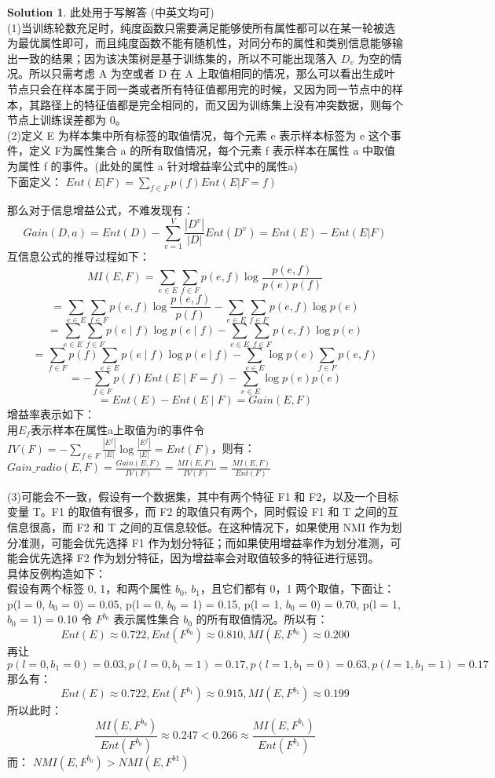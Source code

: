\documentclass[a4paper]{article}
\numberwithin{equation}{section}
\theoremstyle{definition}
\newtheorem*{solution}{Solution}
\begin{document}
\begin{solution}
	此处用于写解答 (中英文均可)\\
 (1)当训练轮数充足时，纯度函数只需要满足能够使所有属性都可以在某一轮被选为最优属性即可，而且纯度函数不能有随机性，对同分布的属性和类别信息能够输出一致的结果；因为该决策树是基于训练集的，所以不可能出现落入 $D_{v}$ 为空的情况。所以只需考虑 A 为空或者 D 在 A 上取值相同的情况，那么可以看出生成叶节点只会在样本属于同一类或者所有特征值都用完的时候，又因为同一节点中的样本，其路径上的特征值都是完全相同的，而又因为训练集上没有冲突数据，则每个节点上训练误差都为 0。\\
 (2)定义 E 为样本集中所有标签的取值情况，每个元素 e 表示样本标签为 e 这个事件，定义 F为属性集合 a 的所有取值情况，每个元素 f 表示样本在属性 a 中取值为属性 f 的事件。(此处的属性 a 针对增益率公式中的属性a)\\
 下面定义：
$Ent(E|F) = \sum_{f\in F}^{}p(f) Ent(E|F = f)$

那么对于信息增益公式，不难发现有：
$$Gain(D, a) = Ent(D) - \sum_{v=1}^{V} \frac{|D^{v}|}{|D|} Ent(D^{v})=Ent(E) - Ent(E|F)$$
互信息公式的推导过程如下：
$$MI(E, F) = \sum_{e \in E} \sum_{f \in F} p(e, f) \log \frac{p(e, f)}{p(e)p(f)} $$
$$= \sum_{e \in E} \sum_{f \in F} p(e, f) \log \frac{p(e, f)}{p(f)} - \sum_{e \in E} \sum_{f \in F} p(e, f) \log p(e)$$
$$= \sum_{e \in E} \sum_{f \in F} p(e\mid f) \log p(e\mid f) - \sum_{e \in E} \sum_{f \in F} p(e, f) \log p(e) $$
$$= \sum_{f \in F}p(f)\sum_{e \in E}  p(e\mid f) \log p(e\mid f) - \sum_{e \in E} \log p(e)\sum_{f \in F} p(e, f) $$
$$= -\sum_{f \in F}p(f)Ent(E \mid F = f) - \sum_{e \in E} \log p(e)p(e) $$
$$=Ent(E)- Ent(E \mid F)=Gain(E,F)$$
增益率表示如下：\\
用\(E_f\)表示样本在属性a上取值为f的事件令$IV(F)=-\sum_{f \in F} \frac{|E^{f}|}{|E|}\log \frac{|E^{f}|}{|E|} = Ent(F)$，则有：\\
$Gain\_radio(E, F) = \frac{Gain(E, F)}{IV(F)} =\frac{MI(E, F)}{IV(F)}=\frac{MI(E, F)}{Ent(F)}$


 (3)可能会不一致，假设有一个数据集，其中有两个特征 F1 和 F2，以及一个目标变量 T。F1 的取值有很多，而 F2 的取值只有两个，同时假设 F1 和 T 之间的互信息很高，而 F2 和 T 之间的互信息较低。在这种情况下，如果使用 NMI 作为划分准测，可能会优先选择 F1 作为划分特征；而如果使用增益率作为划分准测，可能会优先选择 F2 作为划分特征，因为增益率会对取值较多的特征进行惩罚。\\
 具体反例构造如下：\\
假设有两个标签 0, 1，和两个属性 $b_{0}$, $b_{1}$，且它们都有 0，1 两个取值，下面让：
p(l = 0, $b_{0}$ = 0) = 0.05, p(l = 0, $b_{0}$ = 1) = 0.15, p(l = 1, $b_{0}$ = 0) = 0.70, p(l = 1, $b_{0}$ = 1) = 0.10
令 $F^{b_{0}}$ 表示属性集合 $b_{0}$ 的所有取值情况。所以有：
\[Ent(E) \approx 0.722, Ent(F^{b_{0}}) \approx 0.810, MI(E, F^{b_{0}}) \approx 0.200\]
再让
$p(l = 0, b_{1} = 0) = 0.03, p(l = 0, b_{1} = 1) = 0.17, p(l = 1, b_{1} = 0) = 0.63, p(l = 1, b_{1} = 1) = 0.17$
那么有：
\[Ent(E) \approx 0.722, Ent(F^{b_{1}}) \approx 0.915, MI(E, F^{b_{1}}) \approx 0.199\]所以此时：
\[\frac{MI(E, F^{b_{0}})}{Ent(F^{b_{0}})} \approx 0.247< 0.266 \approx \frac{MI(E, F^{b_{1}})}{Ent(F^{b_{1}})}\]
而：
$NMI(E, F^{b_{0}}) > NMI(E, F^{b1})$


\end{solution}
\end{document}
